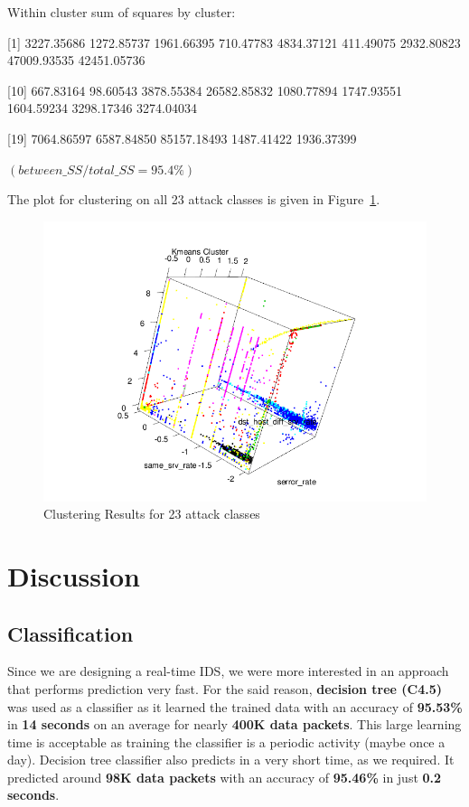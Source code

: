 \documentclass[11pt]{article}
\begin{document}
Within cluster sum of squares by cluster:

[1]  3227.35686  1272.85737  1961.66395   710.47783  4834.37121   411.49075  2932.80823 47009.93535 42451.05736
 
[10]   667.83164    98.60543  3878.55384 26582.85832  1080.77894  1747.93551  1604.59234  3298.17346  3274.04034

[19]  7064.86597  6587.84850 85157.18493  1487.41422  1936.37399

$ (between\_SS / total\_SS =  95.4\%)$

The plot for clustering on all 23 attack classes is given in Figure~\ref{clust23}.

\begin{figure}[htp]
\centering
\includegraphics[scale=0.40]{images/clust-23.png}
\caption{Clustering Results for 23 attack classes}
\label{clust23}
\end{figure}


\section{Discussion}
\label{Sec:Disc}

\subsection{Classification}
Since we are designing a real-time IDS, we were more interested in an approach that performs prediction very fast. For the said reason, \textbf{decision tree (C4.5)} was used as a classifier as it learned the trained data with an accuracy of \textbf{95.53\%} in \textbf{14 seconds} on an average for nearly \textbf{400K data packets}. This large learning time is acceptable as training the classifier is a periodic activity (maybe once a day). Decision tree classifier also predicts in a very short time, as we required. It predicted around \textbf{98K data packets} with an accuracy of \textbf{95.46\%} in just \textbf{0.2 seconds}.
\end{document}
